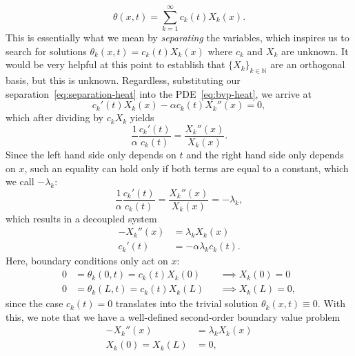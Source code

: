 \begin{equation}\label{eq:separation-heat}
    \theta(x,t) = \sum_{k=1}^\infty c_k(t)X_k(x).
\end{equation}
This is essentially what we mean by \emph{separating} the variables, which inspires us to search for solutions $\theta_k(x,t) = c_k(t)X_k(x)$ where $c_k$ and $X_k$ are unknown. It would be very helpful at this point to establish that $\{X_k\}_{k\in\mathbb N}$ are an orthogonal basis, but this is unknown. Regardless, substituting our separation~\eqref{eq:separation-heat} into the PDE~\eqref{eq:bvp-heat}, we arrive at 
\begin{equation}
    c_k'(t) X_k(x) - \alpha c_k(t) X_k''(x) = 0,
\end{equation}
which after dividing by $c_k X_k$ yields
\begin{equation}
    \frac{1}{\alpha}\frac{c_k'(t)}{c_k(t)} = \frac{X_k''(x)}{X_k(x)}.
\end{equation}
Since the left hand side only depends on $t$ and the right hand side only depends on $x$, such an equality can hold only if both terms are equal to a constant, which we call $-\lambda_k$: 
\begin{equation}
    \frac{1}{\alpha}\frac{c_k'(t)}{c_k(t)} = \frac{X_k''(x)}{X_k(x)} = -\lambda_k ,
\end{equation}
which results in a decoupled system 
\begin{equation}\label{eq:heat-decoupled}
    \begin{aligned}
        -X_k''(x) &= \lambda_k X_k(x)\\
        c_k'(t) &= -\alpha\lambda_k c_k(t).
    \end{aligned}
\end{equation}
Here, boundary conditions only act on $x$: 
\begin{equation}
    \begin{aligned}
        0 &= \theta_k(0,t) = c_k(t)X_k(0) &&\implies X_k(0)=0\\
        0 &= \theta_k(L,t) = c_k(t)X_k(L) &&\implies X_k(L)=0,
    \end{aligned}
\end{equation}
since the case $c_k(t)=0$ translates into the trivial solution $\theta_k(x,t)\equiv 0$. With this, we note that we have a well-defined second-order boundary value problem 
\begin{equation}
    \begin{aligned}
        -X_k''(x) &= \lambda_k X_k(x)\\
        X_k(0)= X_k(L) &= 0,
    \end{aligned}
\end{equation}
